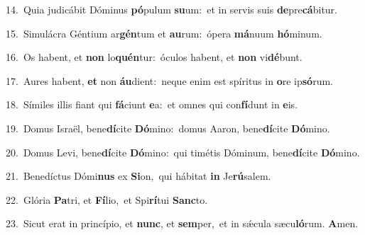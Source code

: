 {\numbfont\textcolor{\numbcolor}{14.}}~Quia judicábit Dóminus \textbf{pó}\-pulum \textbf{su}\-um:~\star et in servis suis \textbf{de}\-pre\-\textbf{cá}\-bitur.\par
{\numbfont\textcolor{\numbcolor}{15.}}~Simulácra Géntium ar\-\textbf{gén}\-tum et \textbf{au}\-rum:~\star ópera \textbf{má}\-nuum \textbf{hó}\-minum.\par
{\numbfont\textcolor{\numbcolor}{16.}}~Os habent, et \textbf{non} lo\-\textbf{quén}\-tur:~\star óculos habent, et \textbf{non} vi\-\textbf{dé}\-bunt.\par
{\numbfont\textcolor{\numbcolor}{17.}}~Aures habent, \textbf{et} non \textbf{áu}\-dient:~\star neque enim est spíritus in \textbf{o}\-re ip\-\textbf{só}\-rum.\par
{\numbfont\textcolor{\numbcolor}{18.}}~Símiles illis fiant qui \textbf{fá}\-ciunt \textbf{e}\-a:~\star et omnes qui con\-\textbf{fí}\-dunt in \textbf{e}\-is.\par
{\numbfont\textcolor{\numbcolor}{19.}}~Domus Israël, bene\-\textbf{dí}\-cite \textbf{Dó}\-mino:~\star domus Aaron, bene\-\textbf{dí}\-cite \textbf{Dó}\-mino.\par
{\numbfont\textcolor{\numbcolor}{20.}}~Domus Levi, bene\-\textbf{dí}\-cite \textbf{Dó}\-mino:~\star qui timétis Dóminum, bene\-\textbf{dí}\-cite \textbf{Dó}\-mino.\par
{\numbfont\textcolor{\numbcolor}{21.}}~Benedíctus Dómi\textbf{nus} ex \textbf{Si}\-on,~\star qui hábitat \textbf{in} Je\-\textbf{rú}\-salem.\par
{\numbfont\textcolor{\numbcolor}{22.}}~Glória \textbf{Pa}\-tri, et \textbf{Fí}\-lio,~\star et Spi\-\textbf{rí}\-tui \textbf{Sanc}\-to.\par
{\numbfont\textcolor{\numbcolor}{23.}}~Sicut erat in princípio, et \textbf{nunc}\-, et \textbf{sem}\-per,~\star et in sǽcula sæcu\-\textbf{ló}\-rum. \textbf{A}\-men.\par
